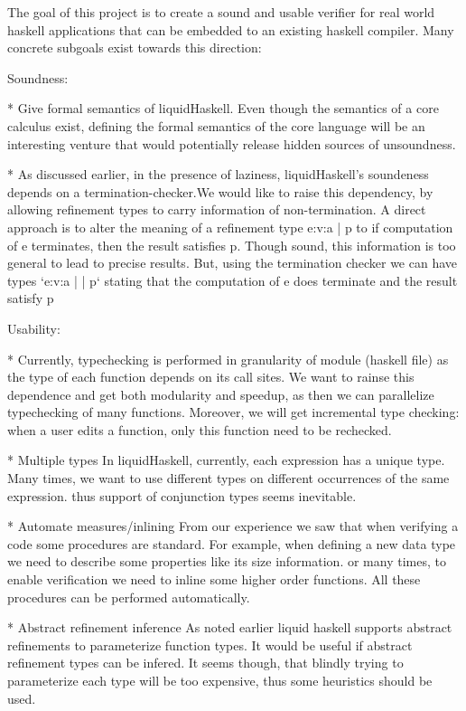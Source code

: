 
The goal of this project is to create a sound and usable verifier
for real world haskell applications that can be embedded to an
existing haskell compiler.
Many concrete subgoals exist towards this direction:

Soundness:
 
* Give formal semantics of liquidHaskell.
  Even though the semantics of a core calculus exist, 
  defining the formal semantics of the core language 
  will be an interesting venture
  that would potentially release hidden sources of unsoundness.


* As discussed earlier, in the presence of laziness, liquidHaskell's soundeness
  depends on a termination-checker.We would like to raise this dependency, 
  by allowing refinement types to carry information of non-termination.
  A direct approach is to alter the meaning of a refinement type e:{v:a | p}
  to if computation of e terminates, then the result satisfies p.
  Though sound, this information is too general to lead to precise results.
  But, using the termination checker we can have types 
  `e:{v:a | | p}`
  stating that the computation of e does terminate and the result satisfy p

Usability:

* Currently, typechecking is performed in granularity of module (haskell file)
  as the type of each function depends on its call sites.
  We want to rainse this dependence and get both modularity and speedup, as 
  then we can parallelize typechecking of many functions.
  Moreover, we will get incremental type checking: when a user edits a function, 
  only this function need to be rechecked.

* Multiple types 
  In liquidHaskell, currently, each expression has a unique type.
  Many times, we want to use different types on different occurrences of the same expression.
  thus support of conjunction types seems inevitable.

* Automate measures/inlining
  From our experience we saw that when verifying a code some procedures are standard.
  For example, when defining a  new data type we need to describe some properties like its size information.
  or many times, to enable verification we need to inline some higher order functions.
  All these procedures can be performed automatically.

* Abstract refinement inference
  As noted earlier liquid haskell supports abstract refinements to parameterize function types.
  It would be useful if abstract refinement types can be infered. 
  It seems though, that blindly trying to parameterize each type will be too expensive, 
  thus some heuristics should be used.


